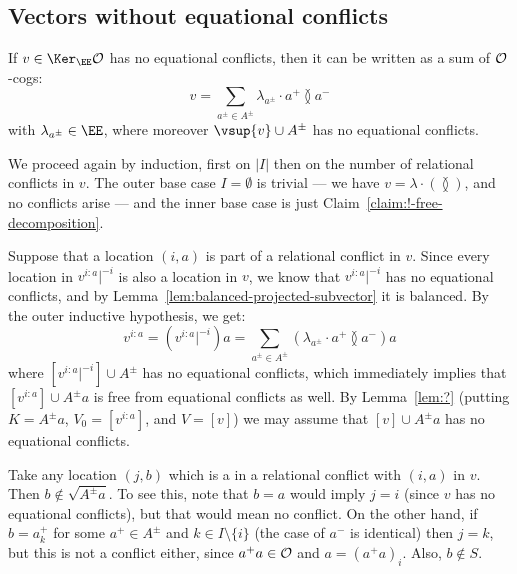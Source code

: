 \subsection{Vectors without equational conflicts}\label{subsec:unambiguous}
\begin{claim}\label{claim:?-free-decomposition}
     If $v \in \Ker_\EE \cal O$ has no equational conflicts, then it can be written as a sum of $\cal O$-cogs:
    \[
        v = \sum_{a^\pm \in A^\pm} \lambda_{a^\pm} \cdot a^+ \between a^-
    \]
    with $\lambda_{a^\pm} \in \EE$, where moreover $\vsup{v} \cup A^\pm$ has no equational conflicts.
\end{claim}
\begin{claimproof}
We proceed again by induction, first on $|I|$ then on the number of relational conflicts in $v$.
The outer base case $I = \emptyset$ is trivial 
--- we have $v = \lambda \cdot ( \between )$, and no conflicts arise
--- and the inner base case is just Claim~\ref{claim:!-free-decomposition}.

Suppose that a location $(i, a)$ is part of a relational conflict in $v$.
Since every location in $v^{i:a}|^{-i}$ is also a location in $v$, we know that $v^{i:a}|^{-i}$ has no equational conflicts, and by Lemma~\ref{lem:balanced-projected-subvector} it is balanced.
By the outer inductive hypothesis, we get:
\[
    v^{i:a} = (v^{i:a}|^{-i}) a = \sum_{a^\pm\in A^\pm} (\lambda_{a^\pm} \cdot a^+ \between a^-) a
\]
where $[v^{i:a}|^{-i}]\cup A^\pm$ has no equational conflicts, which immediately implies that $[v^{i:a}]\cup A^\pm a$ is free from equational conflicts as well. 
By Lemma~\ref{lem:?} (putting $K=A^\pm a$, $V_0=[v^{i:a}]$, and $V=[v]$) we may assume that
$[v]\cup A^\pm a$ has no equational conflicts.

Take any location $(j,b)$ which is a in a relational conflict with $(i,a)$ in $v$. Then $b\not\in\sqrt{A^\pm a}$. To see this, note that $b=a$ would imply $j=i$ (since $v$ has no equational conflicts), but that would mean no conflict. On the other hand, if $b = a^+_k$ for some $a^+ \in A^\pm$ and $k \in I \setminus \{i\}$ (the case of $a^-$ is identical) then $j=k$, but this is not a conflict either, since $a^+a\in\cal O$ and $a=(a^+a)_i$.
Also, $b \not\in S$.


\end{claimproof}
